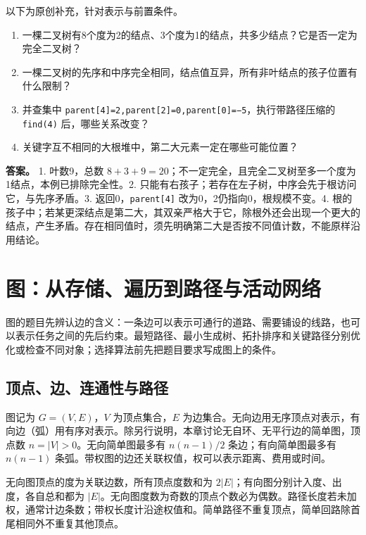 以下为原创补充，针对表示与前置条件。

\begin{enumerate}
\def\labelenumi{\arabic{enumi}.}
\tightlist
\item
  一棵二叉树有8个度为2的结点、3个度为1的结点，共多少结点？它是否一定为完全二叉树？
\item
  一棵二叉树的先序和中序完全相同，结点值互异，所有非叶结点的孩子位置有什么限制？
\item
  并查集中 \texttt{parent{[}4{]}=2,}\allowbreak{}\texttt{parent{[}2{]}=0,}\allowbreak{}\texttt{parent{[}0{]}=−5}，执行带路径压缩的 \texttt{find(4)} 后，哪些关系改变？
\item
  关键字互不相同的大根堆中，第二大元素一定在哪些可能位置？
\end{enumerate}

\textbf{答案。} 1. 叶数9，总数 \(8+3+9=20\)；不一定完全，且完全二叉树至多一个度为1结点，本例已排除完全性。2. 只能有右孩子；若存在左子树，中序会先于根访问它，与先序矛盾。3. 返回0，\texttt{parent{[}4{]}} 改为0，2仍指向0，根规模不变。4. 根的孩子中；若某更深结点是第二大，其双亲严格大于它，除根外还会出现一个更大的结点，产生矛盾。存在相同值时，须先明确第二大是否按不同值计数，不能原样沿用结论。

\chapter{图：从存储、遍历到路径与活动网络}\label{ds-ch6}

图的题目先辨认边的含义：一条边可以表示可通行的道路、需要铺设的线路，也可以表示任务之间的先后约束。最短路径、最小生成树、拓扑排序和关键路径分别优化或检查不同对象；选择算法前先把题目要求写成图上的条件。

\section{顶点、边、连通性与路径}\label{ds-06-01}

图记为 \(G=(V,E)\)，\(V\) 为顶点集合，\(E\) 为边集合。无向边用无序顶点对表示，有向边（弧）用有序对表示。除另行说明，本章讨论无自环、无平行边的简单图，顶点数 \(n=|V|>0\)。无向简单图最多有 \(n(n-1)/2\) 条边；有向简单图最多有 \(n(n-1)\) 条弧。带权图的边还关联权值，权可以表示距离、费用或时间。

无向图顶点的度为关联边数，所有顶点度数和为 \(2|E|\)；有向图分别计入度、出度，各自总和都为 \(|E|\)。无向图度数为奇数的顶点个数必为偶数。路径长度若未加权，通常计边条数；带权长度计沿途权值和。简单路径不重复顶点，简单回路除首尾相同外不重复其他顶点。

